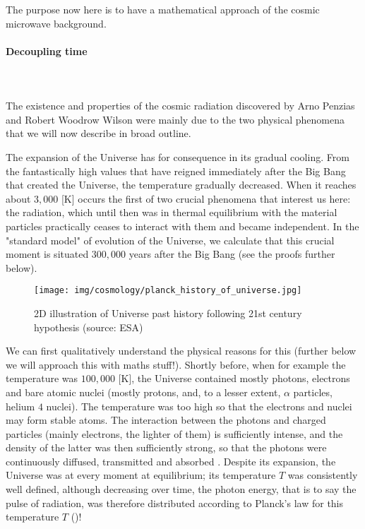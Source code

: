 	The purpose now here is to have a mathematical approach of the  cosmic microwave background.
	
	\paragraph{Decoupling time}\mbox{}\\\\
	The existence and properties of the cosmic radiation discovered by Arno Penzias and Robert Woodrow Wilson were mainly due to the two physical phenomena that we will now describe in broad outline.

	The expansion of the Universe has for consequence in its gradual cooling. From the fantastically high values that have reigned immediately after the Big Bang that created the Universe, the temperature gradually decreased. When it reaches about $3,000$ [K] occurs the first of two crucial phenomena that interest us here: the radiation, which until then was in thermal equilibrium with the material particles practically ceases to interact with them and became independent. In the "standard model" of evolution of the Universe, we calculate that this crucial moment is situated $300,000$ years after the Big Bang (see the proofs further below).
	\begin{figure}[H]
		\centering
		\texttt{[image: img/cosmology/planck\_history\_of\_universe.jpg]}
		\caption[2D illustration of Universe past history following 21st century hypothesis]{2D illustration of Universe past history following 21st century hypothesis (source: ESA)}
	\end{figure}
	We can first qualitatively understand the physical reasons for this (further below we will approach this with maths stuff!). Shortly before, when for example the temperature was $100,000$ [K], the Universe contained mostly photons, electrons and bare atomic nuclei (mostly protons, and, to a lesser extent, $\alpha$ particles, helium $4$ nuclei). The temperature was too high so that the electrons and nuclei may form stable atoms. The interaction between the photons and charged particles (mainly electrons, the lighter of them) is sufficiently intense, and the density of the latter was then sufficiently strong, so that the photons were continuously diffused, transmitted and absorbed . Despite its expansion, the Universe was at every moment at equilibrium; its temperature $T$ was consistently well defined, although decreasing over time, the photon energy, that is to say the pulse of radiation, was therefore distributed according to Planck's law for this temperature $T$ ()!
	
